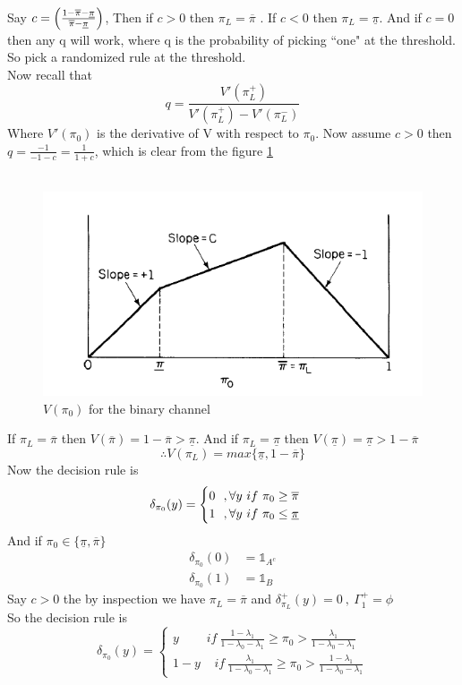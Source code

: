 \documentclass[a4paper,english,12pt]{article}
\begin{document}
\begin{exmp}
Say $c=\Bigl(\frac{1-\overline{\pi}-\underline{\pi}}{\overline{\pi}-\underline{\pi}}\Bigr)$, Then if $c>0$ then $\pi_L=\overline{\pi}$ . If $c<0$ then $\pi_L=\underline{\pi}$. And if $c=0$ then any q will work, where q is the probability of picking ``one" at the threshold. So pick a randomized rule at the threshold.\\
Now recall that
\begin{equation}
q= \frac{V'(\pi^+_L)}{V'(\pi^+_L)-V'(\pi^-_L)}
\end{equation}
Where $V'(\pi_0)$ is the derivative of V with respect to $\pi_0$. Now assume $c>0$ then $q=\frac{-1}{-1-c}=\frac{1}{1+c}$, which is clear from the figure \ref{fig:binaryminimax}\\
\\
\begin{figure}[h!]
\centering
\includegraphics[width=0.6\linewidth]{Figures/Binary_Minimax}
\caption{$V(\pi_0)$ for the binary channel}
\label{fig:binaryminimax}
\end{figure}
If $\pi_L=\overline{\pi}$ then $V(\overline{\pi})=1-\overline{\pi}>\underline{\pi}$. And if $\pi_L=\underline{\pi}$ then $V(\underline{\pi})=\underline{\pi}>1-\overline{\pi}$\\
\begin{equation}
\therefore V(\pi_L)= max{\{\underline{\pi},1-\overline{\pi}}\}
\end{equation}
Now the decision rule is
\begin{equation}
\delta_{\pi_0}(y)=\begin{cases}0~~,\forall y ~if~ \pi_0\geq\overline{\pi}\\
				1~~,\forall y~ if~ \pi_0\leq\underline{\pi}\\
				\end{cases}\\
\end{equation}
And if $\pi_0\in\{\underline{\pi},\overline{\pi}\}$
\begin{align}
\delta_{\pi_0}(0)&=\mathds{1}_{A^{c}}\\
\delta_{\pi_0}(1)&=\mathds{1}_{B}
\end{align}
Say $c>0$ the by inspection we have $\pi_L=\overline{\pi}$ and $\delta^{+}_{\pi_L}(y)=0~,~\Gamma_{1}^{+}=\phi$\\
So the decision rule is
\begin{equation}
\delta_{\pi_0}(y)= \begin{cases}
y ~~~~~~~~~~if ~\frac{1-\lambda_1}{1-\lambda_0-\lambda_1}\geq\pi_0>\frac{\lambda_1}{1-\lambda_0-\lambda_1}\\
1-y ~~~~~if ~\frac{\lambda_1}{1-\lambda_0-\lambda_1}\geq\pi_0>\frac{1-\lambda_1}{1-\lambda_0-\lambda_1}
\end{cases}
\end{equation}


\end{exmp}
\end{document}
